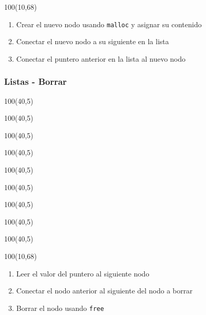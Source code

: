 \documentclass[aspectratio=169]{beamer}
\begin{document}
\begin{frame}[t]
    \begin{textblock}{100}(10,68)
    \begin{enumerate}[A]
    \item Crear el nuevo nodo usando \texttt{malloc} y asignar su contenido
    \item Conectar el nuevo nodo a su siguiente en la lista
    \item Conectar el puntero anterior en la lista al nuevo nodo
    \end{enumerate}
    \end{textblock}
\end{frame}

\begin{frame}[t]
    \frametitle{Listas - Borrar}
    \begin{textblock}{100}(40,5)  \end{textblock}  %
    \begin{textblock}{100}(40,5)  \end{textblock}  %
    \begin{textblock}{100}(40,5)  \end{textblock}  %
    \begin{textblock}{100}(40,5)  \end{textblock}  %
    \begin{textblock}{100}(40,5)  \end{textblock}  %
    \begin{textblock}{100}(40,5)  \end{textblock}  %
    \begin{textblock}{100}(40,5)  \end{textblock}  %
    \begin{textblock}{100}(40,5)  \end{textblock}  %
    \begin{textblock}{100}(40,5)  \end{textblock}  %
    \begin{textblock}{100}(10,68)
    \begin{enumerate}[A]
    \item Leer el valor del puntero al siguiente nodo
    \item Conectar el nodo anterior al siguiente del nodo a borrar
    \item Borrar el nodo usando \texttt{free}
    \end{enumerate}
    \end{textblock}
\end{frame}
\end{document}
